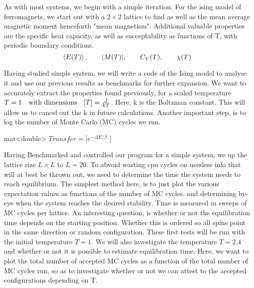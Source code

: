 \documentclass[10pt, twocolumn]{revtex4-1}
\begin{document}
As with most systems, we begin with a simple iteration. For the ising model of ferromagnets, we start out with a $2\times 2$ lattice to find
as well as the mean average magnetic moment henceforth "mean magnetism". Additional valuable properties are the specific heat capacity,
as well as succeptability as functions of T, with periodic boundary conditions.
\[
    \ev{E(T)}, \qq{} \abs{M(T)}, \qq{} C_V(T), \qq{} \chi(T)
\] %

Having studied simple system, we will write a code of the Ising model to analyse it and use our previous results as benchmarks for further expansion. We
want to accurately extract the properties found previously, for a scaled temperature $T = 1 \qq{with dimensions} \qty[ T ] = \frac{ J }{ kT }$. Here,
k is the Boltzman constant. This will allow us to cancel out the k in future calculations. Another important step, is to log the number of Monte Carlo
(MC) cycles we run.
\begin{algorithm}
    mat<double> $Transfer = [ e^{-\Delta E/ \beta }$ ]\;
    \caption{}
\end{algorithm}

Having Benchmarked and controlled our program for a simple system, we up the lattice size $L\times L$ to $L=20$. To abvoid wasting cpu cycles on usesless
info that will at best be thrown out, we need to determine the time the system needs to reach equilibrium. The simplest method here, is to just plot the
various expectation values as functions of the number of MC cycles. and determining by-eye when the system reaches the desired stability. Time is measured in
sweeps of MC cycles per lattice. An interesting question, is whether or not the equilibration time depends on the starting position. Whether this is
ordered so all spins point in the same direction or random configuration. These first tests will be run with the initial temperature $T=1$. We will also
investigate the temperature $T = 2.4$ and whether or not it is possible to estimate equilibration time. Here, we want to plot the total number of accepted
MC cycles as a function of the total number of MC cycles run, so as to investigate whether or not we can attest to the accepted configurations depending
on T.
\end{document}
